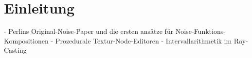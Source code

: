 \chapter{Einleitung}
- Perlins Original-Noise-Paper und die ersten ansätze für Noise-Funktions-Kompositionen
- Prozedurale Textur-Node-Editoren
- Intervallarithmetik im Ray-Casting
